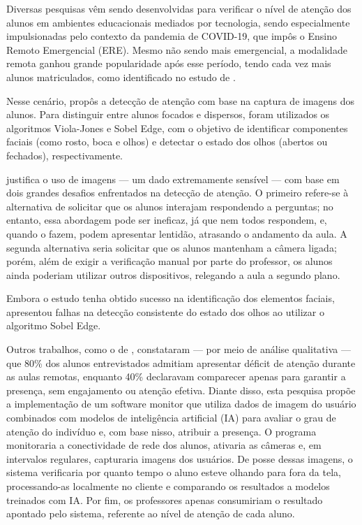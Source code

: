 Diversas pesquisas vêm sendo desenvolvidas para verificar o nível de atenção dos alunos em ambientes educacionais mediados por tecnologia, sendo especialmente impulsionadas pelo contexto da pandemia de COVID-19, que impôs o Ensino Remoto Emergencial (ERE). Mesmo não sendo mais emergencial, a modalidade remota ganhou grande popularidade após esse período, tendo cada vez mais alunos matriculados, como identificado no estudo de \cite{moranEnsinoSuperiorDistancia2009}.

Nesse cenário, \cite{ongApplicationImageProcessing2021} propôs a detecção de atenção com base na captura de imagens dos alunos. Para distinguir entre alunos focados e dispersos, foram utilizados os algoritmos Viola-Jones e Sobel Edge, com o objetivo de identificar componentes faciais (como rosto, boca e olhos) e detectar o estado dos olhos (abertos ou fechados), respectivamente.

\cite{ongApplicationImageProcessing2021} justifica o uso de imagens — um dado extremamente sensível — com base em dois grandes desafios enfrentados na detecção de atenção. O primeiro refere-se à alternativa de solicitar que os alunos interajam respondendo a perguntas; no entanto, essa abordagem pode ser ineficaz, já que nem todos respondem, e, quando o fazem, podem apresentar lentidão, atrasando o andamento da aula. A segunda alternativa seria solicitar que os alunos mantenham a câmera ligada; porém, além de exigir a verificação manual por parte do professor, os alunos ainda poderiam utilizar outros dispositivos, relegando a aula a segundo plano.

Embora o estudo tenha obtido sucesso na identificação dos elementos faciais, apresentou falhas na detecção consistente do estado dos olhos ao utilizar o algoritmo Sobel Edge.

Outros trabalhos, como o de \cite{sahaAttendanceAttentionMonitoringa2021}, constataram — por meio de análise qualitativa — que 80\% dos alunos entrevistados admitiam apresentar déficit de atenção durante as aulas remotas, enquanto 40\% declaravam comparecer apenas para garantir a presença, sem engajamento ou atenção efetiva. Diante disso, esta pesquisa propõe a implementação de um software monitor que utiliza dados de imagem do usuário combinados com modelos de inteligência artificial (IA) para avaliar o grau de atenção do indivíduo e, com base nisso, atribuir a presença. O programa monitoraria a conectividade de rede dos alunos, ativaria as câmeras e, em intervalos regulares, capturaria imagens dos usuários. De posse dessas imagens, o sistema verificaria por quanto tempo o aluno esteve olhando para fora da tela, processando-as localmente no cliente e comparando os resultados a modelos treinados com IA. Por fim, os professores apenas consumiriam o resultado apontado pelo sistema, referente ao nível de atenção de cada aluno.

